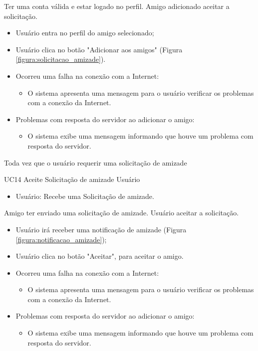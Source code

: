 {Ter uma conta válida e estar logado no perfil.}
{Amigo adicionado aceitar a solicitação.}
{
\begin{itemize}
		\item Usuário entra no perfil do amigo selecionado;
		\item Usuário clica no botão "Adicionar aos amigos" (Figura \ref{figura:solicitacao_amizade}).	
\end{itemize}
}
{
\begin{itemize}
	\item Ocorreu uma falha na conexão com a Internet:
	\begin{itemize}
		\item O sistema apresenta uma mensagem para o usuário verificar os problemas com a conexão da Internet.
	\end{itemize}
	
	\item Problemas com resposta do servidor ao adicionar o amigo:
	\begin{itemize}
	\item O sistema exibe uma mensagem informando que houve um problema com resposta do servidor.
	\end{itemize}

\end{itemize}
}
{Toda vez que o usuário requerir uma solicitação de amizade}
{
 
}
\casoDeUso
{UC14}
{Aceite Solicitação de amizade}
{Usuário}
{
\begin{itemize}
	\item Usuário: Recebe uma Solicitação de amizade.
\end{itemize}

}
{Amigo ter enviado uma solicitação de amizade.}
{Usuário aceitar a solicitação.}
{
\begin{itemize}
		\item Usuário irá receber uma notificação de amizade (Figura \ref{figura:notificacao_amizade});
		\item Usuário clica no botão "Aceitar", para aceitar o amigo.
\end{itemize}
}
{
\begin{itemize}
	\item Ocorreu uma falha na conexão com a Internet:
	\begin{itemize}
		\item O sistema apresenta uma mensagem para o usuário verificar os problemas com a conexão da Internet.
	\end{itemize}
	
	\item Problemas com resposta do servidor ao adicionar o amigo:
	\begin{itemize}
	\item O sistema exibe uma mensagem informando que houve um problema com resposta do servidor.
	\end{itemize}

\end{itemize}
}
